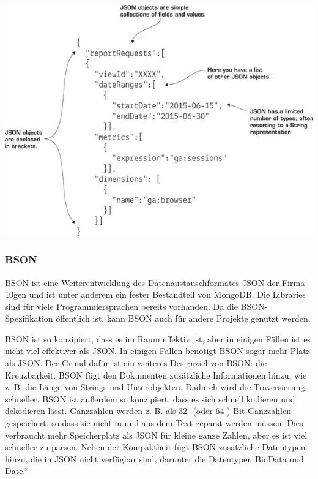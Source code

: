 \begin{center}
\includegraphics[scale=1]{images/Darstellung_eines_JSON-Objekts}
\end{center}

\subsubsection{BSON}

BSON ist eine Weiterentwicklung des Datenaustauschformates JSON der Firma 10gen und ist unter anderem ein fester Bestandteil von MongoDB. Die Libraries sind für viele Programmiersprachen bereits vorhanden. Da die BSON-Spezifikation öffentlich ist, kann BSON auch für andere Projekte genutzt werden.\cite{thKloeln}

BSON ist so konzipiert, dass es im Raum effektiv ist, aber in einigen Fällen ist es nicht viel effektiver als JSON. In einigen Fällen benötigt BSON sogar mehr Platz als JSON. Der Grund dafür ist ein weiteres Designziel von BSON: die Kreuzbarkeit. BSON fügt den Dokumenten zusätzliche Informationen hinzu, wie z. B. die Länge von Strings und Unterobjekten. Dadurch wird die Traversierung schneller.\cite{bson} BSON ist außerdem so konzipiert, dass es sich schnell kodieren und dekodieren lässt. Ganzzahlen werden z. B. als 32- (oder 64-) Bit-Ganzzahlen gespeichert, so dass sie nicht in und aus dem Text geparst werden müssen. Dies verbraucht mehr Speicherplatz als JSON für kleine ganze Zahlen, aber es ist viel schneller zu parsen. Neben der Kompaktheit fügt BSON zusätzliche Datentypen hinzu, die in JSON nicht verfügbar sind, darunter die Datentypen BinData und Date.“
